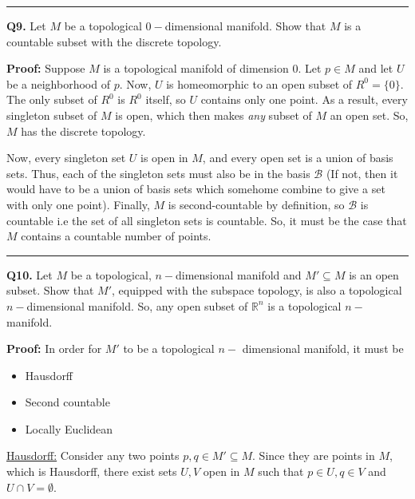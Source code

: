 \documentclass{article}
\begin{document}
\vskip 0.5cm
\hrule 
\vskip 0.5cm

\textbf{Q9.} Let $M$ be a topological $0-$dimensional manifold. Show that $M$ is a countable subset with the discrete topology.

\vskip 0.5cm
\textbf{Proof:} 
Suppose $M$ is a topological manifold of dimension $0$. Let $p \in M$ and let $U$ be a neighborhood of $p$. Now, $U$ is homeomorphic to an open subset of $R^0 = \{ 0 \}$. The only subset of $R^0$ is $R^0$ itself, so $U$ contains only one point. As a result, every singleton subset of $M$ is open, which then makes \emph{any} subset of $M$ an open set. So, $M$ has the discrete topology.

\vskip 0.25cm
Now, every singleton set $U$ is open in $M$, and every open set is a union of basis sets. Thus, each of the singleton sets must also be in the basis $\mathcal B$ (If not, then it would have to be a union of basis sets which somehome combine to give a set with only one point). Finally, $M$ is second-countable by definition, so $\mathcal{B}$ is countable i.e the set of all singleton sets is countable. So, it must be the case that $M$ contains a countable number of points.

\vskip 0.5cm
\hrule 
\vskip 0.5cm

\textbf{Q10.} Let $M$ be a topological, $n-$dimensional manifold and $M' \subseteq M$ is an open subset. Show that $M'$, equipped with the subspace topology, is also a topological $n-$dimensional manifold. So, any open subset of $\mathbb{R}^n$ is a topological $n-$manifold.

\vskip 0.5cm
\textbf{Proof:} 
In order for $M'$ to be a topological $n-$ dimensional manifold, it must be 
\begin{itemize}
  \item Hausdorff
  \item Second countable
  \item Locally Euclidean
\end{itemize}

\vskip 0.25cm
\underline{Hausdorff:} Consider any two points $p, q \in M' \subseteq M$. Since they are points in $M$, which is Hausdorff, there exist sets $U, V$ open in $M$ such that $p \in U, q \in V$ and $U \cap V = \emptyset$. 
\end{document}
